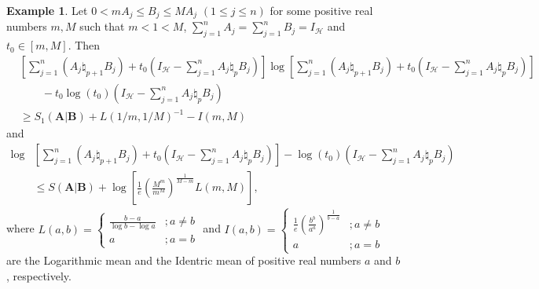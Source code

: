 \documentclass[12pt, reqno]{amsart}
\theoremstyle{definition}
\newtheorem{example}[theorem]{Example}
\theoremstyle{remark}
\numberwithin{equation}{section}
\begin{document}
\begin{example}\label{coro}
Let  $0<m A_j \leq B_j \leq M A_j\,\,(1\leq j\leq n)$  for some positive real numbers $m, M$  such that $m<1<M$, $\sum_{j=1}^nA_j=\sum_{j=1}^nB_j=I_{\mathscr H}$ and $t_0\in[m,M]$. Then
{\footnotesize\begin{align*}
&\left[\sum_{j=1}^n(A_j\natural_{p+1}B_j)
+t_0\left(I_{\mathscr H}-\sum_{j=1}^nA_j\natural_pB_j\right)\right]\log\left[\sum_{j=1}^n(A_j\natural_{p+1}B_j)
+t_0\left(I_{\mathscr H}-\sum_{j=1}^nA_j\natural_pB_j\right)\right]\\&\qquad-t_0\log(t_0)\left(I_{\mathscr H}-\sum_{j=1}^nA_j\natural_pB_j\right)\\
&\ge S_1(\mathbf{A}|\mathbf{B})+L(1/m,1/M)^{-1}-I(m,M)
\end{align*}}
and
{\footnotesize\begin{align*}
\log&\left[\sum_{j=1}^n(A_j\natural_{p+1}B_j)+t_0\left(I_{\mathscr H}-\sum_{j=1}^nA_j\natural_pB_j\right)\right]-\log(t_0)\left(I_{\mathscr H}-\sum_{j=1}^nA_j\natural_pB_j\right)\\
&\le S(\mathbf{A}|\mathbf{B})+\log\left[\frac{1}{e}\left(\frac{M^m}{m^M}\right)^{\frac{1}{M-m}}L(m,M)\right],
\end{align*}}
where $L(a,b)=\begin{cases}\frac{b-a}{\log b-\log a} & ;a\neq b\\ a & ; a=b\end{cases}$ and $I(a,b)=\begin{cases}\frac{1}{e}\left(\frac{b^b}{a^a}\right)^{\frac{1}{b-a}} & ;a \neq b\\ a & ;a=b\end{cases}$  are the Logarithmic mean and the Identric mean of positive real numbers $a$ and $b$, respectively.
\end{example}

\end{document}
